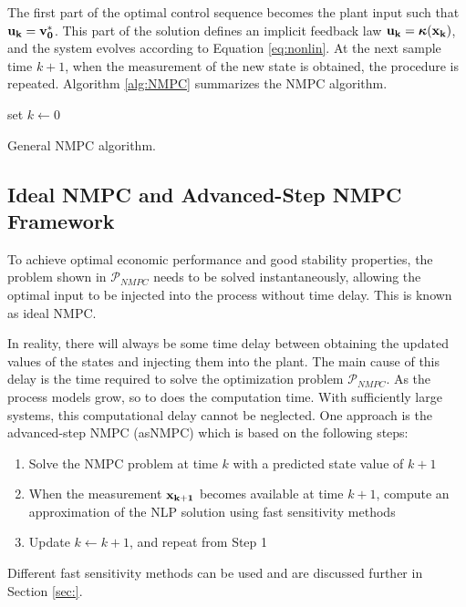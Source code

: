 The first part of the optimal control sequence becomes the plant input such that $\bf{u}_k=\bf{v}_0^*$.
This part of the solution defines an implicit feedback law $\bf{u}_k=\boldsymbol{\kappa}(\bf{x}_k)$, and the system evolves according to Equation \ref{eq:nonlin}.
At the next sample time $k+1$, when the measurement of the new state is obtained, the procedure is repeated.
Algorithm \ref{alg:NMPC} summarizes the NMPC algorithm.\\
\begin{algorithm}[H]
	\SetAlgoLined
	set $k\leftarrow 0$\;
	\caption{General NMPC algorithm.}
	\label{alg:NMPC}
\end{algorithm}
\subsection{Ideal NMPC and Advanced-Step NMPC Framework}
To achieve optimal economic performance and good stability properties, the problem shown in $\mathcal{P}_{NMPC}$ needs to be solved instantaneously, allowing the optimal input to be injected into the process without time delay.
This is known as ideal NMPC.
\par
In reality, there will always be some time delay between obtaining the updated values of the states and injecting them into the plant.
The main cause of this delay is the time required to solve the optimization problem $\mathcal{P}_{NMPC}$.
As the process models grow, so to does the computation time.
With sufficiently large systems, this computational delay cannot be neglected.
One approach is the advanced-step NMPC (asNMPC) which is based on the following steps:
\begin{enumerate}
	\item Solve the NMPC problem at time $k$ with a predicted state value of $k+1$
	\item When the measurement $\bf{x}_{k+1}$ becomes available at time $k+1$, compute an approximation of the NLP solution using fast sensitivity methods
	\item Update $k\leftarrow k+1$, and repeat from Step 1
\end{enumerate}
Different fast sensitivity methods can be used and are discussed further in Section \ref{sec:}.
